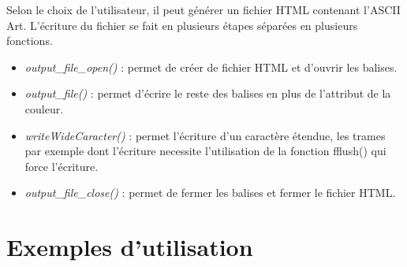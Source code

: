 \documentclass{article}
\begin{document}
Selon le choix de l'utilisateur, il peut générer un fichier HTML contenant l'ASCII Art. L'écriture du fichier se fait en plusieurs étapes séparées en plusieurs fonctions.  \\
\begin{itemize}
\item \emph{output\_file\_open()} : permet de créer de fichier HTML et d'ouvrir les balises. \\
\item \emph{output\_file()} : permet d'écrire le reste des balises en plus de l'attribut de la couleur.  \\
\item \emph{writeWideCaracter()} : permet l'écriture d'un caractère étendue, les trames par exemple dont l'écriture necessite l'utilisation de la fonction fflush() qui force l'écriture. \\
\item \emph{output\_file\_close()} : permet de fermer les balises et fermer le fichier HTML.
\end{itemize}
\section{Exemples d'utilisation}
\end{document}

